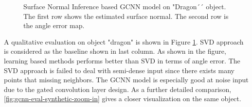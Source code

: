 \documentclass[border=15pt, multi, tikz]{article}
\begin{document}
\begin{figure}[H]
	
	\caption{Surface Normal Inference based GCNN model on "Dragon´´ object. The first row shows the estimated surface normal. The second row is the angle error map.}
	\label{fig:gcnn-eval}
\end{figure}


A qualitative evaluation on object "dragon" is shown in Figure \ref{fig:gcnn-eval}. SVD approach is considered as the baseline shown in last column. As shown in the figure, learning based methods performs better than SVD in terms of angle error. The SVD approach is failed to deal with semi-dense input since there exists many points that missing neighbors. The GCNN model is especially good at noise input due to the gated convolution layer design. As a further detailed comparison, \ref{fig:gcnn-eval-synthetic-zoom-in} gives a closer visualization on the same object. 
\end{document}
